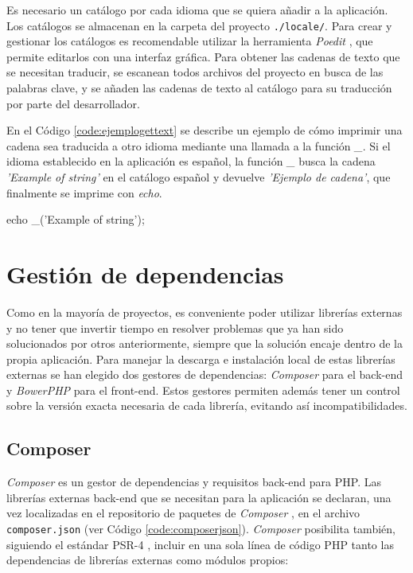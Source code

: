 Es necesario un catálogo por cada idioma que se quiera añadir a la aplicación. Los catálogos se almacenan en la carpeta del proyecto \texttt{./locale/}. Para crear y gestionar los catálogos es recomendable utilizar la herramienta \textit{Poedit} \cite{poedit}, que permite editarlos con una interfaz gráfica. Para obtener las cadenas de texto que se necesitan traducir, se escanean todos archivos del proyecto en busca de las palabras clave, y se añaden las cadenas de texto al catálogo para su traducción por parte del desarrollador.

En el Código \ref{code:ejemplogettext} se describe un ejemplo de cómo imprimir una cadena sea traducida a otro idioma mediante una llamada a la función \textit{\_}. Si el idioma establecido en la aplicación es español, la función \textit{\_} busca la cadena \textit{'Example of string'} en el catálogo español y devuelve \textit{'Ejemplo de cadena'}, que finalmente se imprime con \textit{echo}.

\begin{code}[label=code:ejemplogettext,language=php,caption=Ejemplo de traducción con la librería \textit{gettext}]
echo _('Example of string');
\end{code}


\section{Gestión de dependencias\label{extra:mvc:dependencias}}

Como en la mayoría de proyectos, es conveniente poder utilizar librerías externas y no tener que invertir tiempo en resolver problemas que ya han sido solucionados por otros anteriormente, siempre que la solución encaje dentro de la propia aplicación. Para manejar la descarga e instalación local de estas librerías externas se han elegido dos gestores de dependencias: \textit{Composer} \cite{composer} para el \gls{back-end} y \textit{BowerPHP} \cite{bowerphp} para el \gls{front-end}. Estos gestores permiten además tener un control sobre la versión exacta necesaria de cada librería, evitando así incompatibilidades.

\subsection*{Composer\label{extra:mvc:composer}}

\textit{Composer} es un gestor de dependencias y requisitos \gls{back-end} para \gls{PHP}. Las librerías externas \gls{back-end} que se necesitan para la aplicación se declaran, una vez localizadas en el repositorio de paquetes de \textit{Composer} \cite{composerrepositorio}, en el archivo \texttt{composer.json} (ver Código \ref{code:composerjson}). \textit{Composer} posibilita también, siguiendo el estándar PSR-4 \cite{psr4}, incluir en una sola línea de código \gls{PHP} tanto las dependencias de librerías externas como módulos propios:

